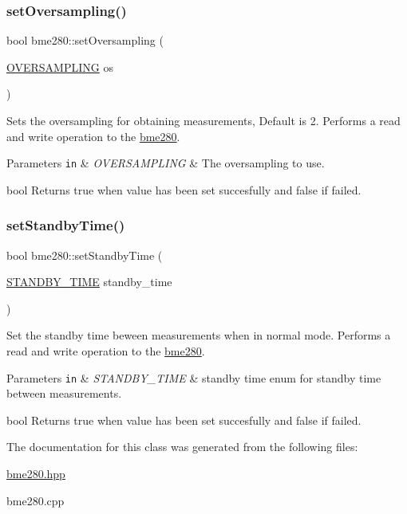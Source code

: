 \subsubsection{\texorpdfstring{set\+Oversampling()}{setOversampling()}}
{\footnotesize\ttfamily bool bme280\+::set\+Oversampling (\begin{DoxyParamCaption}\item[{\hyperlink{bme280_8hpp_a8eb2f33991b63046b2887939a003837f}{O\+V\+E\+R\+S\+A\+M\+P\+L\+I\+NG}}]{os }\end{DoxyParamCaption})}



Sets the oversampling for obtaining measurements, Default is 2. Performs a read and write operation to the \hyperlink{classbme280}{bme280}. 


\begin{DoxyParams}[1]{Parameters}
\mbox{\tt in}  & {\em O\+V\+E\+R\+S\+A\+M\+P\+L\+I\+NG} & The oversampling to use.\\
\hline
\end{DoxyParams}
bool Returns true when value has been set succesfully and false if failed. \mbox{\label{classbme280_ab88f4e002affd59867caeb4037944140}} 
\subsubsection{\texorpdfstring{set\+Standby\+Time()}{setStandbyTime()}}
{\footnotesize\ttfamily bool bme280\+::set\+Standby\+Time (\begin{DoxyParamCaption}\item[{\hyperlink{bme280_8hpp_a2db4a9862b3a2e31301ac185385d2520}{S\+T\+A\+N\+D\+B\+Y\+\_\+\+T\+I\+ME}}]{standby\+\_\+time }\end{DoxyParamCaption})}



Set the standby time beween measurements when in normal mode. Performs a read and write operation to the \hyperlink{classbme280}{bme280}. 


\begin{DoxyParams}[1]{Parameters}
\mbox{\tt in}  & {\em S\+T\+A\+N\+D\+B\+Y\+\_\+\+T\+I\+ME} & standby time enum for standby time between measurements.\\
\hline
\end{DoxyParams}
bool Returns true when value has been set succesfully and false if failed. 

The documentation for this class was generated from the following files\+:\begin{DoxyCompactItemize}
\item 
\hyperlink{bme280_8hpp}{bme280.\+hpp}\item 
bme280.\+cpp\end{DoxyCompactItemize}
